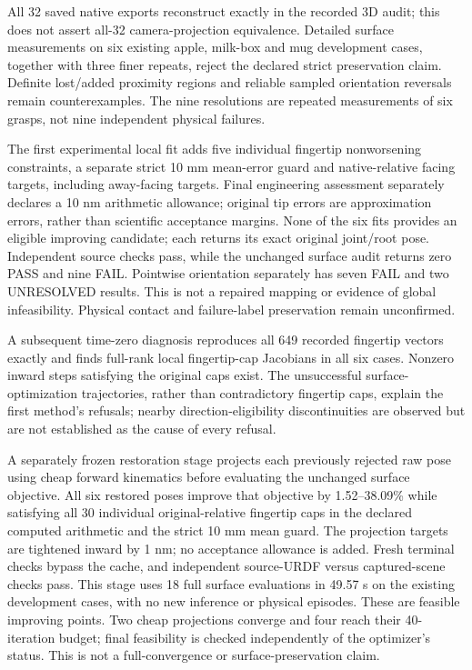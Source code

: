 \documentclass[10pt,letterpaper]{article}
\begin{document}
All 32 saved native exports reconstruct exactly in the recorded 3D audit;
this does not assert all-32 camera-projection equivalence. Detailed surface
measurements on six existing apple, milk-box and mug development cases, together
with three finer repeats, reject the declared strict preservation claim.
Definite lost/added proximity regions and reliable sampled orientation reversals
remain counterexamples. The nine resolutions are repeated measurements of six
grasps, not nine independent physical failures.

The first experimental local fit adds five individual fingertip nonworsening
constraints, a separate strict 10 mm mean-error guard and native-relative facing
targets, including away-facing targets. Final engineering assessment separately
declares a 10 nm arithmetic allowance; original tip errors are approximation
errors, rather than scientific acceptance margins. None of the six fits provides
an eligible improving candidate; each returns its exact original joint/root pose.
Independent source checks pass, while the unchanged surface audit returns zero
PASS and nine FAIL. Pointwise orientation separately has seven FAIL and two
UNRESOLVED results. This is not a repaired mapping or evidence of global
infeasibility. Physical contact and failure-label preservation remain unconfirmed.


A subsequent time-zero diagnosis reproduces all 649 recorded fingertip vectors
exactly and finds full-rank local fingertip-cap Jacobians in all six cases.
Nonzero inward steps satisfying the original caps exist. The unsuccessful
surface-optimization trajectories, rather than contradictory fingertip caps,
explain the first method's refusals; nearby direction-eligibility discontinuities
are observed but are not established as the cause of every refusal.

A separately frozen restoration stage projects each previously rejected raw
pose using cheap forward kinematics before evaluating the unchanged surface
objective. All six restored poses improve that objective by 1.52--38.09\% while
satisfying all 30 individual original-relative fingertip caps in the declared
computed arithmetic and the strict 10 mm mean guard. The projection targets
are tightened inward by 1 nm; no acceptance allowance is added. Fresh terminal
checks bypass the cache, and independent source-URDF versus captured-scene
checks pass. This stage uses 18 full surface evaluations in 49.57 s on the
existing development cases, with no new inference or physical episodes. These
are feasible improving points. Two cheap projections converge and four reach
their 40-iteration budget; final feasibility is checked independently of the
optimizer's status. This is not a full-convergence or surface-preservation claim.
\end{document}
